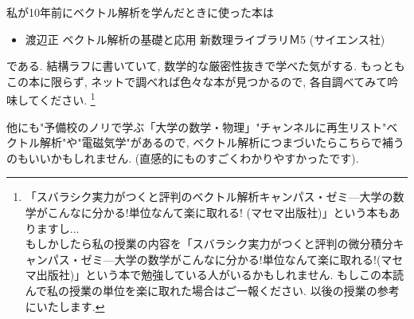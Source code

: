 \documentclass[dvipdfmx,a4paper,11pt]{article}
\theoremstyle{definition}
\begin{document}
私が10年前にベクトル解析を学んだときに使った本は
 \begin{itemize}
\item 渡辺正 ベクトル解析の基礎と応用 新数理ライブラリＭ5 (サイエンス社)
\end{itemize}
である. 結構ラフに書いていて, 数学的な厳密性抜きで学べた気がする.
もっともこの本に限らず, ネットで調べれば色々な本が見つかるので, 各自調べてみて吟味してください. 
\footnote{「スバラシク実力がつくと評判のベクトル解析キャンパス・ゼミ—大学の数学がこんなに分かる!単位なんて楽に取れる! (マセマ出版社)」という本もありますし... \\ もしかしたら私の授業の内容を「スバラシク実力がつくと評判の微分積分キャンパス・ゼミ—大学の数学がこんなに分かる!単位なんて楽に取れる!(マセマ出版社)」という本で勉強している人がいるかもしれません. もしこの本読んで私の授業の単位を楽に取れた場合はご一報ください. 以後の授業の参考にいたします.}

他にも"予備校のノリで学ぶ「大学の数学・物理」"チャンネルに再生リスト"ベクトル解析"や"電磁気学"があるので, ベクトル解析につまづいたらこちらで補うのもいいかもしれません.
(直感的にものすごくわかりやすかったです).


 
 
\end{document}
